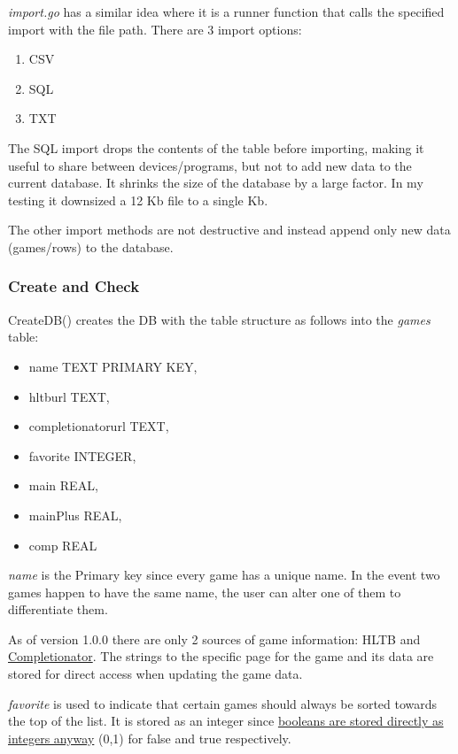\textit{import.go} has a similar idea where it is a runner function
that calls the specified import with the file path.
There are 3 import options:
\begin{enumerate}
	\item CSV
	\item SQL
	\item TXT
\end{enumerate}

The SQL import drops the contents of the table before importing, making
it useful to share between devices/programs, but not to add new data
to the current database. It shrinks the size of the database by a
large factor. In my testing it downsized a 12 Kb file to
a single Kb.

The other import methods are not destructive and instead append only
new data (games/rows) to the database.

\subsubsection{Create and Check}

CreateDB() creates the DB with the table structure as follows into
the \textit{games} table:
\begin{itemize}
	\item name TEXT PRIMARY KEY,
	\item hltburl TEXT,
	\item completionatorurl TEXT,
	\item favorite INTEGER,
	\item main REAL,
	\item mainPlus REAL,
	\item comp REAL
\end{itemize}

\textit{name} is the Primary key since every game has a unique name. In the
event two games happen to have the same name, the user can alter one
of them to differentiate them.

As of version 1.0.0 there are only 2 sources of game information:
HLTB and \href{https://completionator.com/}{Completionator}.
The strings to the specific page for the game and its data are stored
for direct access when updating the game data.

\textit{favorite} is used to indicate that certain games should
always be sorted towards the top of the list. It is stored as an
integer since \href{https://www.sqlite.org/datatype3.html}{booleans
are stored directly as integers anyway} (0,1) for false and true respectively.

